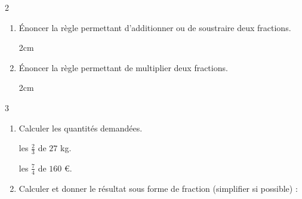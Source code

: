 \documentclass[a4paper]{book}
\begin{document}
{\newpage

\setcounter{exo}{0}
\NomPrenom
{}
\TableauCompetencesCinq
    {}
    {}
    {}
    {}
    {}

    \vspace{0.5cm}

    \vspace{0.5cm}
    
    \begin{exerciceNote}{2}
        \begin{enumerate}
            \item Énoncer la règle permettant d'additionner ou de soustraire deux fractions.
            \begin{ZoneReponse}{2cm}
            \end{ZoneReponse}

            \item Énoncer la règle permettant de multiplier deux fractions.
            \begin{ZoneReponse}{2cm}
            \end{ZoneReponse}
        \end{enumerate}
    \end{exerciceNote}
    
    
    \begin{exerciceNote}{3}
        \begin{enumerate}
            \item Calculer les quantités demandées.
            
            \begin{minipage}[t]{0.23\textwidth}
                les $\frac{2}{3}$ de $27$ kg. 
            \vspace{3cm}
            \end{minipage}\hfill \vline \hfill
            \begin{minipage}[t]{0.23\textwidth}
                \raggedright
                les $\frac{7}{4}$ de $160$ \euro. 
                \vspace{3cm}
            \end{minipage}

            \bigskip
            
            \item Calculer et donner le résultat sous forme de fraction (simplifier si possible) :
        \end{enumerate}
        

\end{exerciceNote}}
\end{document}
